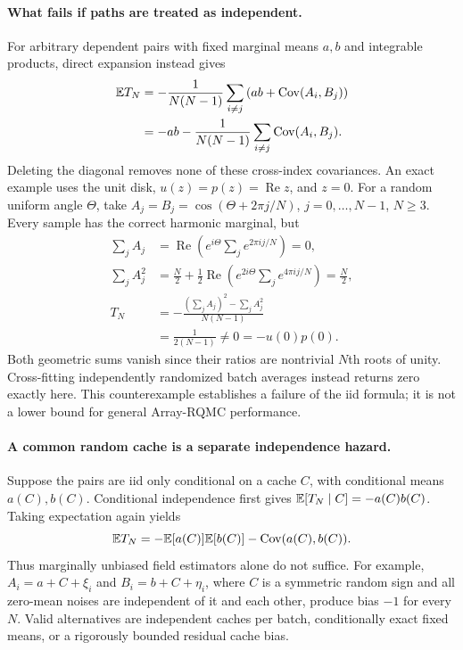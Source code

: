 \paragraph{What fails if paths are treated as independent.}
For arbitrary dependent pairs with fixed marginal means $a,b$ and integrable
products, direct expansion instead gives
\begin{align}
 \mathbb{E} T_N
 &=-\frac{1}{N(N-1)}\sum_{i\ne j}
       \left(ab+\operatorname{Cov}(A_i,B_j)\right)\\
 &=-ab-\frac{1}{N(N-1)}\sum_{i\ne j}\operatorname{Cov}(A_i,B_j).
 \label{eq:crossindexbias}
\end{align}
Deleting the diagonal removes none of these cross-index covariances.
An exact example uses the unit disk, $u(z)=p(z)=\operatorname{Re}z$, and
$z=0$.  For a random uniform angle $\Theta$, take
$A_j=B_j=\cos(\Theta+2\pi j/N)$, $j=0,\ldots,N-1$, $N\ge3$.
Every sample has the correct harmonic marginal, but
\begin{align}
 \sum_j A_j&=\operatorname{Re}\left(e^{i\Theta}
                    \sum_j e^{2\pi i j/N}\right)=0,\\
 \sum_j A_j^2&=\frac{N}{2}+\frac{1}{2}\operatorname{Re}\left(e^{2i\Theta}
                    \sum_j e^{4\pi i j/N}\right)=\frac N2,\\
 T_N&=-\frac{(\sum_j A_j)^2-\sum_j A_j^2}{N(N-1)}
       \\
    &=\frac{1}{2(N-1)}\ne 0=-u(0)p(0).
\end{align}
Both geometric sums vanish since their ratios are nontrivial $N$th roots
of unity.  Cross-fitting independently randomized batch averages instead
returns zero exactly here.  This counterexample establishes a failure of
the iid formula; it is not a lower bound for general Array-RQMC performance.

\paragraph{A common random cache is a separate independence hazard.}
Suppose the pairs are iid only conditional on a cache $C$, with conditional
means $a(C),b(C)$.  Conditional independence first gives
$\mathbb{E}[T_N\mid C]=-a(C)b(C)$.  Taking expectation again yields
\begin{equation}
 \mathbb{E} T_N=-\mathbb{E}[a(C)]\mathbb{E}[b(C)]-\operatorname{Cov}(a(C),b(C)).
\end{equation}
Thus marginally unbiased field estimators alone do not suffice.  For example,
$A_i=a+C+\xi_i$ and $B_i=b+C+\eta_i$, where $C$ is a symmetric random sign
and all zero-mean noises are independent of it and each other, produce bias
$-1$ for every $N$.  Valid alternatives are independent caches per batch,
conditionally exact fixed means, or a rigorously bounded residual cache bias.

